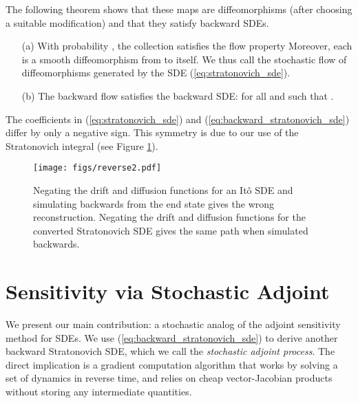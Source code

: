 \documentclass[twoside]{article}
\begin{document}
The following theorem shows that these maps are diffeomorphisms (after choosing a suitable modification) and that they satisfy backward SDEs.
\begin{theo} \label{thm:stochastic_flow}
\begin{enumerate}
\item[(a)] With probability , the collection  satisfies the flow property
Moreover, each  is a smooth diffeomorphism from  to itself. 
We thus call  the stochastic flow of diffeomorphisms generated by the SDE (\ref{eq:stratonovich_sde}).
\item[(b)] The backward flow  satisfies the backward SDE:
for all  and  such that .
\end{enumerate}
\end{theo}

The coefficients in (\ref{eq:stratonovich_sde}) and (\ref{eq:backward_stratonovich_sde}) differ by only a negative sign. This symmetry is due to our use of the Stratonovich integral (see Figure \ref{fig:stochastic.flow}). 


\begin{figure}[ht]
\centering
\texttt{[image: figs/reverse2.pdf]}


\caption{
Negating the drift and diffusion functions for an It\^o SDE and simulating backwards from the end state gives the wrong reconstruction. 
Negating the drift and diffusion functions for the converted Stratonovich SDE gives the same path when simulated backwards. 
} \label{fig:stochastic.flow}
\vspace{-4mm}
\end{figure}
 \section{Sensitivity via Stochastic Adjoint} \label{sec:adjoint}







We present our main contribution: a stochastic analog of the adjoint sensitivity method for SDEs. 
We use (\ref{eq:backward_stratonovich_sde}) to derive another backward Stratonovich SDE, which we call the \textit{stochastic adjoint process}.
The direct implication is a gradient computation algorithm that works by solving a set of dynamics in reverse time, and relies on cheap vector-Jacobian products without storing any intermediate quantities.
\end{document}
